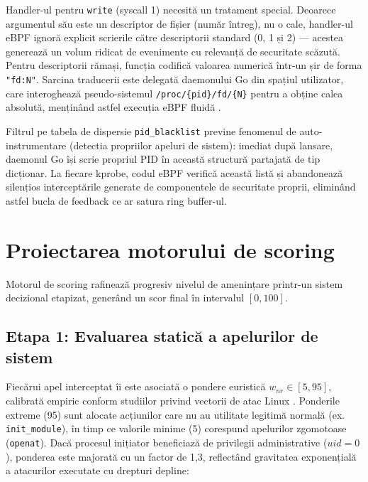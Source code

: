\par Handler-ul pentru \texttt{write} (syscall 1) necesită un tratament special. Deoarece argumentul său este un descriptor de fișier (număr întreg), nu o cale, handler-ul eBPF ignoră explicit scrierile către descriptorii standard (0, 1 și 2) --- acestea generează un volum ridicat de evenimente cu relevanță de securitate scăzută. Pentru descriptorii rămași, funcția codifică valoarea numerică într-un șir de forma \texttt{"fd:N"}. Sarcina traducerii este delegată daemonului Go din spațiul utilizator, care interoghează pseudo-sistemul \texttt{/proc/\{pid\}/fd/\{N\}} pentru a obține calea absolută, menținând astfel execuția eBPF fluidă \cite{Kerrisk2010}.

\par Filtrul pe tabela de dispersie \texttt{pid\_blacklist} previne fenomenul de auto-instrumentare (detectia propriilor apeluri de sistem): imediat după lansare, daemonul Go își scrie propriul PID în această structură partajată de tip dicționar. La fiecare kprobe, codul eBPF verifică această listă și abandonează silențios interceptările generate de componentele de securitate proprii, eliminând astfel bucla de feedback ce ar satura ring buffer-ul.


\section{Proiectarea motorului de scoring}
\label{sec:scoring_design}

\par Motorul de scoring rafinează progresiv nivelul de amenințare printr-un sistem decizional etapizat, generând un scor final în intervalul $[0, 100]$.

\subsection{Etapa 1: Evaluarea statică a apelurilor de sistem}
\label{subsec:static_weights}

\par Fiecărui apel interceptat îi este asociată o pondere euristică $w_{nr} \in [5, 95]$, calibrată empiric conform studiilor privind vectorii de atac Linux \cite{Cozzi2018, Buczak2016}. Ponderile extreme (95) sunt alocate acțiunilor care nu au utilitate legitimă normală (ex. \texttt{init\_module}), în timp ce valorile minime (5) corespund apelurilor zgomotoase (\texttt{openat}). Dacă procesul inițiator beneficiază de privilegii administrative ($uid = 0$), ponderea este majorată cu un factor de 1,3, reflectând gravitatea exponențială a atacurilor executate cu drepturi depline:

